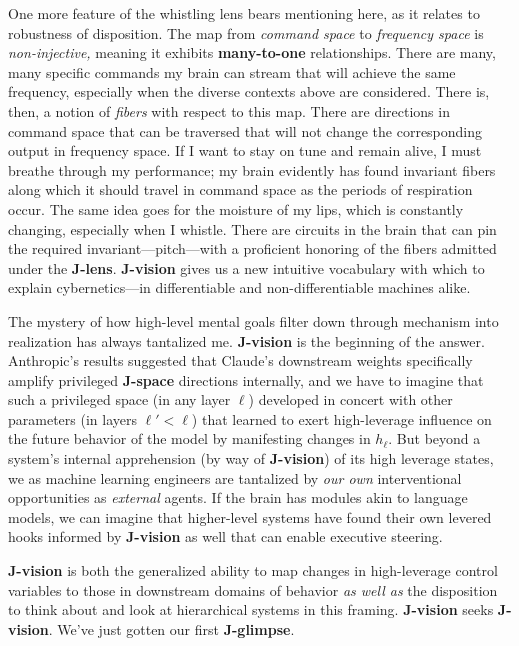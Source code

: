 \documentclass{article}
\begin{document}
One more feature of the whistling lens bears mentioning here, as it relates to robustness of disposition. The map from \textit{command space} to \textit{frequency space} is \textit{non-injective,} meaning it exhibits \textbf{many-to-one} relationships. There are many, many specific commands my brain can stream that will achieve the same frequency, especially when the diverse contexts above are considered. There is, then, a notion of \textit{fibers} with respect to this map. There are directions in command space that can be traversed that will not change the corresponding output in frequency space. If I want to stay on tune and remain alive, I must breathe through my performance; my brain evidently has found invariant fibers along which it should travel in command space as the periods of respiration occur. The same idea goes for the moisture of my lips, which is constantly changing, especially when I whistle. There are circuits in the brain that can pin the required invariant---pitch---with a proficient honoring of the fibers admitted under the \textbf{J-lens}. \textbf{J-vision} gives us a new intuitive vocabulary with which to explain cybernetics---in differentiable and non-differentiable machines alike. 

The mystery of how high-level mental goals filter down through mechanism into realization has always tantalized me. \textbf{J-vision} is the beginning of the answer. Anthropic's results suggested that Claude's downstream weights specifically amplify privileged \textbf{J-space} directions internally, and we have to imagine that such a privileged space (in any layer \(\ell\)) developed in concert with other parameters (in layers \(\ell' < \ell\)) that learned to exert high-leverage influence on the future behavior of the model by manifesting changes in  \(h_\ell\). But beyond a system's internal apprehension (by way of \textbf{J-vision}) of its high leverage states, we as machine learning engineers are tantalized by \textit{our own} interventional opportunities as \textit{external} agents. If the brain has modules akin to language models, we can imagine that higher-level systems have found their own levered hooks informed by \textbf{J-vision} as well that can enable executive steering. 

\textbf{J-vision} is both the generalized ability to map changes in high-leverage control variables to those in downstream domains of behavior \textit{as well as} the disposition to think about and look at hierarchical systems in this framing. \textbf{J-vision} seeks \textbf{J-vision}. We've just gotten our first \textbf{J-glimpse}. 
\end{document}
